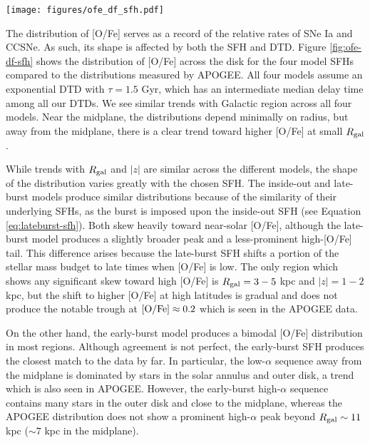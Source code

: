 \documentclass[twocolumn,twocolappendix]{aastex631}
\begin{document}
\begin{figure*}
    \centering
    \texttt{[image: figures/ofe\_df\_sfh.pdf]}
    \caption{Distributions of [O/Fe] from multi-zone models with different SFHs. All assume the exponential ($\tau=1.5$ Gyr) DTD. The format of each panel is the same as in Figure \ref{fig:feh-df-comparison}, except that all distributions are smoothed with a box-car width of 0.05 dex. Distributions from APOGEE DR17, binned and smoothed similarly, are presented in the right-most column for reference.}
    \label{fig:ofe-df-sfh}
\end{figure*}

The distribution of [O/Fe] serves as a record of the relative rates of SNe Ia and CCSNe. As such, its shape is affected by both the SFH and DTD. Figure \ref{fig:ofe-df-sfh} shows the distribution of [O/Fe] across the disk for the four model SFHs compared to the distributions measured by APOGEE. All four models assume an exponential DTD with $\tau=1.5$ Gyr, which has an intermediate median delay time among all our DTDs. We see similar trends with Galactic region across all four models. Near the midplane, the distributions depend minimally on radius, but away from the midplane, there is a clear trend toward higher [O/Fe] at small $R_{\rm gal}$.

While trends with $R_{\rm gal}$ and $|z|$ are similar across the different models, the shape of the distribution varies greatly with the chosen SFH. The inside-out and late-burst models produce similar distributions because of the similarity of their underlying SFHs, as the burst is imposed upon the inside-out SFH (see Equation \ref{eq:lateburst-sfh}). Both skew heavily toward near-solar [O/Fe], although the late-burst model produces a slightly broader peak and a less-prominent high-[O/Fe] tail. This difference arises because the late-burst SFH shifts a portion of the stellar mass budget to late times when [O/Fe] is low. The only region which shows any significant skew toward high [O/Fe] is $R_{\rm gal}=3-5$ kpc and $|z|=1-2$ kpc, but the shift to higher [O/Fe] at high latitudes is gradual and does not produce the notable trough at ${\rm [O/Fe]}\approx0.2$ which is seen in the APOGEE data. 

On the other hand, the early-burst model produces a bimodal [O/Fe] distribution in most regions. Although agreement is not perfect, the early-burst SFH produces the closest match to the data by far. In particular, the low-$\alpha$ sequence away from the midplane is dominated by stars in the solar annulus and outer disk, a trend which is also seen in APOGEE. However, the early-burst high-$\alpha$ sequence contains many stars in the outer disk and close to the midplane, whereas the APOGEE distribution does not show a prominent high-$\alpha$ peak beyond $R_{\rm gal}\sim11$ kpc ($\sim7$ kpc in the midplane). 
\end{document}
